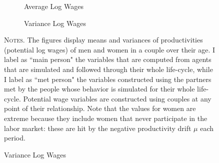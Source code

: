 \documentclass[12pt]{article}
\begin{document}
\begin{figure}[h!]
	\caption{---Labor productivities means and variances by age: simulated data}
	\label{fig:symmetry}
	
	\begin{subfigure}{.49\textwidth}
		\centering
		\caption{Average Log Wages}
		\label{fig:sub-firs1t}
		\scalebox{0.5}{ } 
	\end{subfigure}
	\begin{subfigure}{.49\textwidth}
		\centering
		\caption{Variance Log Wages}
		\label{fig:sub-second1}
		\scalebox{0.5}{ } 
	\end{subfigure}
	
	
	
	\begin{minipage}{0.99\textwidth} %
		
		\hspace{50em}
		
		{\footnotesize \textsc{Notes.} The figures display means and variances of productivities (potential log wages) of men and women in a couple over their age. I label as ``main person" the variables that are computed from agents that are simulated and followed through their whole life-cycle, while I label as ``met person" the variables constructed using the partners met by the people whose behavior is simulated for their whole life-cycle. Potential wage variables are constructed using couples at any point of their relationship. Note that the values for women are extreme because they include women that never participate in the labor market: these are hit by the negative productivity drift $\mu$ each period.\par}
	\end{minipage}
\end{figure}
\FloatBarrier
\end{document}
